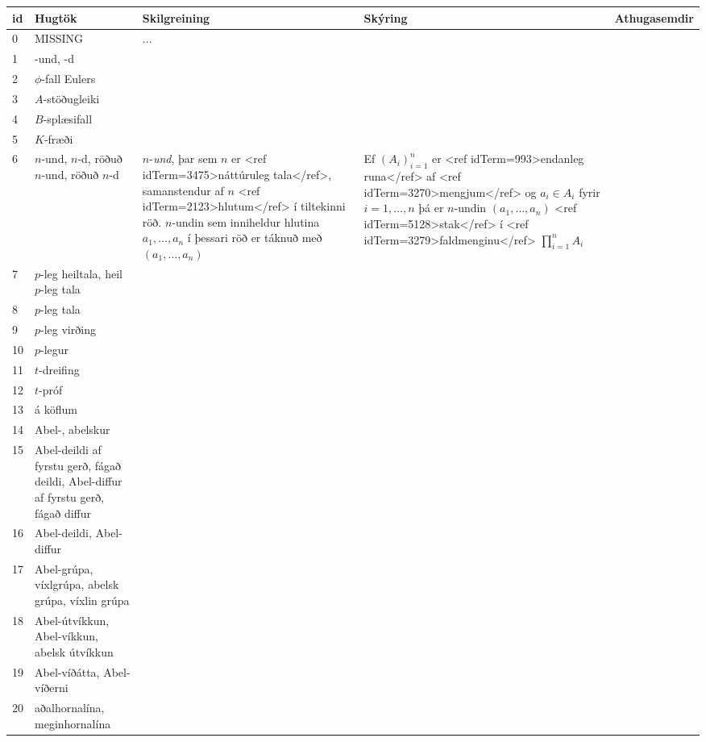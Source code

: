 \begin{longtable}{p{}|p{}|p{}|p{}|p{}}
\hline
\textbf{id} & \textbf{Hugtök} & \textbf{Skilgreining} & \textbf{Skýring} & \textbf{Athugasemdir} \\
\hline
0 & MISSING & ... &  &  \\
\hline
1 & -und, -d &  &  &  \\
\hline
2 & \(\phi\)-fall Eulers &  &  &  \\
\hline
3 & \(A\)-stöðugleiki &  &  &  \\
\hline
4 & \(B\)-splæsifall &  &  &  \\
\hline
5 & \(K\)-fræði &  &  &  \\
\hline
6 & \(n\)-und, \(n\)-d, röðuð \(n\)-und, röðuð \hbox{\(n\)-d} & $n$-\textit{und}, þar sem $n$ er <ref idTerm=3475>náttúruleg tala</ref>, samanstendur af $n$ <ref idTerm=2123>hlutum</ref> í tiltekinni röð. $n$-undin sem inniheldur hlutina $a_1, \ldots, a_n$ í þessari röð er táknuð með $(a_1, \ldots, a_n)$ & Ef $\left( A_i \right)_{i=1}^n$ er <ref idTerm=993>endanleg runa</ref> af <ref idTerm=3270>mengjum</ref> og $a_i \in A_i$ fyrir $i=1,\dots,n$ þá er $n$-undin $(a_1,\dots,a_n)$ <ref idTerm=5128>stak</ref> í <ref idTerm=3279>faldmenginu</ref> $\prod_{i=1}^n A_i$ &  \\
\hline
7 & \(p\)-leg heiltala, heil \(p\)-leg tala &  &  &  \\
\hline
8 & \(p\)-leg tala &  &  &  \\
\hline
9 & \(p\)-leg virðing &  &  &  \\
\hline
10 & \(p\)-legur &  &  &  \\
\hline
11 & \(t\)-dreifing &  &  &  \\
\hline
12 & \(t\)-próf &  &  &  \\
\hline
13 & á köflum &  &  &  \\
\hline
14 & Abel-, abelskur &  &  &  \\
\hline
15 & Abel-deildi af fyrstu gerð, fágað deildi, Abel-diffur af fyrstu gerð, fágað diffur &  &  &  \\
\hline
16 & Abel-deildi, Abel-diffur &  &  &  \\
\hline
17 & Abel-grúpa, víxlgrúpa, abelsk grúpa, víxlin grúpa &  &  &  \\
\hline
18 & Abel-útvíkkun, Abel-víkkun, abelsk útvíkkun &  &  &  \\
\hline
19 & Abel-víðátta, Abel-víðerni &  &  &  \\
\hline
20 & aðalhornalína, meginhornalína &  &  &  \\

\end{longtable}
